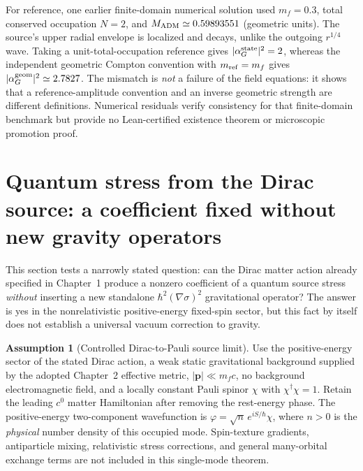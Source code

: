 \documentclass[11pt,a4paper,oneside]{report}
\numberwithin{equation}{chapter}
\theoremstyle{definition}\newtheorem{definition}[theorem]{Definition}
\newtheorem{assumption}[theorem]{Assumption}
\theoremstyle{remark}\newtheorem{remark}[theorem]{Remark}
\begin{document}
For reference, one earlier finite-domain numerical solution used
$m_f=0.3$, total conserved occupation $N=2$, and
$M_{\rm ADM}\simeq0.59893551$ (geometric units).  The source's upper
radial envelope is localized and decays, unlike the outgoing
$r^{1/4}$ wave.  Taking a unit-total-occupation reference gives
$|\alpha_G^{\rm state}|^2=2$, whereas the independent geometric
Compton convention with $m_{\rm ref}=m_f$ gives
$|\alpha_G^{\rm geom}|^2\simeq2.7827$.
The mismatch is \emph{not} a failure of the field equations: it shows
that a reference-amplitude convention and an inverse geometric
strength are different definitions.  Numerical residuals verify
consistency for that finite-domain benchmark but provide no
Lean-certified existence theorem or microscopic promotion proof.

\section{Quantum stress from the Dirac source: a coefficient fixed without new gravity operators}\label{sec:quantumsource}
This section tests a narrowly stated question: can the Dirac matter action already specified in Chapter~1 produce a nonzero coefficient of a quantum source stress \emph{without} inserting a new standalone $\hbar^2(\nabla\sigma)^2$ gravitational operator? The answer is yes in the nonrelativistic positive-energy fixed-spin sector, but this fact by itself does not establish a universal vacuum correction to gravity.

\begin{assumption}[Controlled Dirac-to-Pauli source limit]\label{ass:pauli}
Use the positive-energy sector of the stated Dirac action, a weak static gravitational background supplied by the adopted Chapter~2 effective metric, $|\bm p|\ll m_fc$, no background electromagnetic field, and a locally constant Pauli spinor $\chi$ with $\chi^\dagger\chi=1$. Retain the leading $c^0$ matter Hamiltonian after removing the rest-energy phase. The positive-energy two-component wavefunction is $\varphi=\sqrt{n}\,e^{iS/\hbar}\chi$, where $n>0$ is the \emph{physical} number density of this occupied mode. Spin-texture gradients, antiparticle mixing, relativistic stress corrections, and general many-orbital exchange terms are not included in this single-mode theorem.
\end{assumption}
\end{document}
